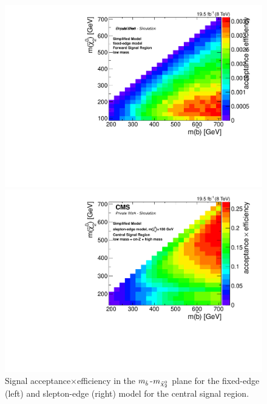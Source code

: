 \begin{figure}[htbp]
\centering
\begin{minipage}[t]{0.49\textwidth}
  \includegraphics[width=\textwidth]{plots/limits/T6bblledge_70_GeV_Edge_Endcap_lowMll_signalEfficiency.pdf}
\end{minipage}
\begin{minipage}[t]{0.49\textwidth}
\includegraphics[width=\textwidth]{plots/limits/T6bbllslepton_m_n_1_100_Barrel_signalEfficiency_Reweighted.pdf}
\end{minipage}
\caption{Signal acceptance$\times$efficiency in the $m_{\tilde{b}}$-$m_{{\tilde{\chi}^0_2}}$ plane for the fixed-edge (left) and slepton-edge (right) model for the central signal region.}
\label{fig:sigEff}
\end{figure}
